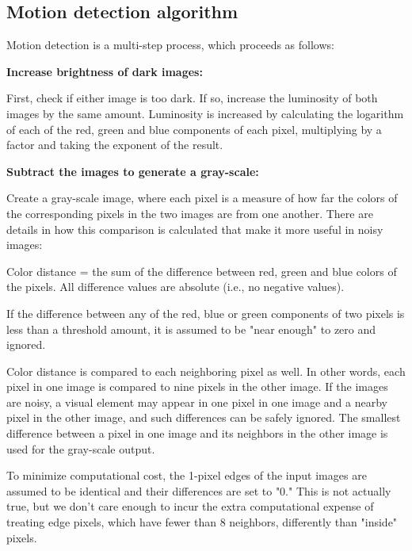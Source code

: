   \subsection{Motion detection algorithm}

    Motion detection is a multi-step process, which proceeds as follows:

    \BE
    \I \textbf{Increase brightness of dark images:}

       First, check if either image is too dark.  If so, increase the
       luminosity of both images by the same amount.  Luminosity is
       increased by calculating the logarithm of each of the red, green
       and blue components of each pixel, multiplying by a factor and
       taking the exponent of the result.

    \I \textbf{Subtract the images to generate a gray-scale:}

       Create a gray-scale image, where each pixel is a measure
       of how far the colors of the corresponding pixels in the
       two images are from one another.  There are details in how
       this comparison is calculated that make it more useful in
       noisy images:

       \BI
       \I Color distance = the sum of the difference between red,
          green and blue colors of the pixels.  All difference
          values are absolute (i.e., no negative values).

       \I If the difference between any of the red, blue or green
          components of two pixels is less than a threshold amount,
          it is assumed to be "near enough" to zero and ignored.

       \I Color distance is compared to each neighboring pixel as
          well.  In other words, each pixel in one image is compared to
          nine pixels in the other image.
          If the images are noisy, a visual element may appear in
          one pixel in one image and a nearby pixel in the other
          image, and such differences can be safely ignored.
          The smallest difference between a pixel in one image
          and its neighbors in the other image is used for the
          gray-scale output.

       \I To minimize computational cost, the 1-pixel edges of the
          input images are assumed to be identical and their differences
          are set to "0."  This is not actually true, but we don't care
          enough to incur the extra computational expense of treating
          edge pixels, which have fewer than 8 neighbors, differently
          than "inside" pixels.
       \EI

